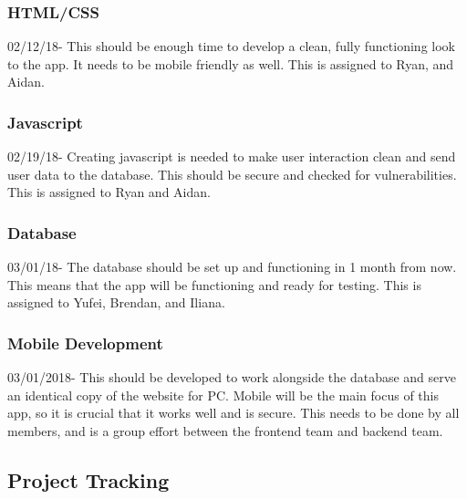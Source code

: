 \documentclass[12pt]{article}
\begin{document}
\subsubsection{HTML/CSS}
	02/12/18- This should be enough time to develop a clean, fully functioning look to the app. It needs to be mobile friendly as well. This is assigned to Ryan, and Aidan.
\subsubsection{Javascript}
	02/19/18- Creating javascript is needed to make user interaction clean and send user data to the 	database. This should be secure and checked for vulnerabilities. This is assigned to Ryan and Aidan.
\subsubsection{Database}
	03/01/18- The database should be set up and functioning in 1 month from now. This means that 	the app will be functioning and ready for testing. This is assigned to Yufei, Brendan, and Iliana.
\subsubsection{Mobile Development}
	03/01/2018- This should be developed to work alongside the database and serve an identical 	copy of the website for PC. Mobile will be the main focus of this app, so it is crucial that it 	works well and is secure. This needs to be done by all members, and is a group effort between the frontend team and backend team.

\subsection{Project Tracking}
\end{document}
